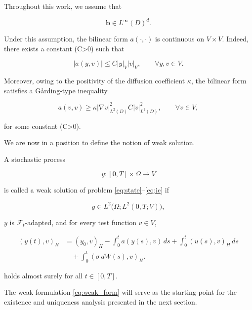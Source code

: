 Throughout this work, we assume that

\[
\mathbf b
\in
L^\infty(D)^d.
\]

Under this assumption, the bilinear form \(a(\cdot,\cdot)\) is continuous on \(V\times V\). Indeed, there 
exists a constant (C>0) such that

\[
|a(y,v)|
\le
C
|y|_V
|v|_V,
\qquad
\forall y,v\in V.
\]

Moreover, owing to the positivity of the diffusion coefficient \(\kappa\), the bilinear form satisfies a 
G{\aa}rding-type inequality

\begin{equation}
a(v,v)
\ge
\kappa
|\nabla v|_{L^2(D)}^2
C
|v|_{L^2(D)}^2,
\qquad
\forall v\in V,
\label{eq:garding}
\end{equation}

for some constant (C>0).

We are now in a position to define the notion of weak solution.

\begin{definition}
A stochastic process

\[
y:
[0,T]\times\Omega
\rightarrow
V
\]

is called a weak solution of problem
\eqref{eq:state}--\eqref{eq:ic}
if

\[
y
\in
L^2
\bigl(
\Omega;
L^2(0,T;V)
\bigr),
\]

\(y\) is \(\mathcal F_t\)-adapted, and for every test function \(v\in V\),

\begin{equation}
\begin{aligned}
(y(t),v)_H
&=
(y_0,v)_H
-
\int_0^t
a(y(s),v)\,ds
+
\int_0^t
(u(s),v)_H\,ds
\\
&\quad
+
\int_0^t
(\sigma\,dW(s),v)_H .
\end{aligned}
\label{eq:weak_form}
\end{equation}

holds almost surely for all \(t\in[0,T]\).
\end{definition}

The weak formulation \eqref{eq:weak_form} will serve as the starting point for the 
existence and uniqueness analysis presented in the next section.
